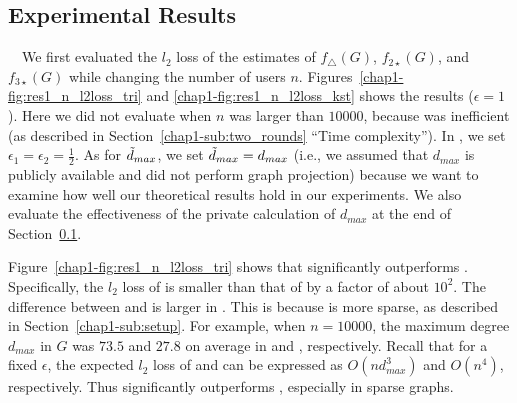 \subsection{Experimental Results}
\label{chap1-sub:results}
~~We first evaluated the $l_2$ loss of the estimates of 
$f_\triangle(G)$, 
$f_{2\star}(G)$, 
and $f_{3\star}(G)$ 
while changing the number of users $n$. 
Figures~\ref{chap1-fig:res1_n_l2loss_tri} and \ref{chap1-fig:res1_n_l2loss_kst} shows the results ($\epsilon=1$). 
Here 
we did not evaluate  when $n$ was larger than $10000$, because  was inefficient 
(as described in Section~\ref{chap1-sub:two_rounds} ``Time complexity''). 
In , we set $\epsilon_1 = \epsilon_2 = \frac{1}{2}$. 
As for $\tilde{d}_{max}$, 
we set $\tilde{d}_{max} = d_{max}$ (i.e., we assumed that $d_{max}$ is publicly available and did not perform graph projection) 
because we want to examine how well our theoretical results hold in our experiments. 
We also evaluate the effectiveness of the private calculation of $d_{max}$ at the end of Section~\ref{chap1-sub:results}. 

Figure~\ref{chap1-fig:res1_n_l2loss_tri} shows that  significantly outperforms . 
Specifically, the $l_2$ loss of  is smaller than that of  by a factor of about $10^2$. 
The difference between  and  is larger in \Orkut{}. 
This is because \Orkut{} is more sparse, as described in Section~\ref{chap1-sub:setup}. 
For example, when $n=10000$, the maximum degree $d_{max}$ in $G$ was $73.5$ and $27.8$ on average in \IMDB{} and \Orkut{}, respectively. 
Recall that for a fixed $\epsilon$, 
the expected $l_2$ loss of  and  
can be expressed as $O(nd_{max}^3)$ and $O(n^4)$, respectively. 
Thus  significantly outperforms , especially in sparse graphs. 

